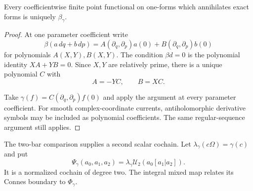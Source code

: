 \begin{lemma}\label{mht:lem:point-current-classification}
Every coefficientwise finite point functional on one-forms
which annihilates exact forms is uniquely $\beta_\gamma$.
\end{lemma}
\begin{proof}
At one parameter coefficient write
\[
 \beta(a\,dq+b\,dp)
   =A(\partial_q,\partial_p)a(0)
       +B(\partial_q,\partial_p)b(0)
\]
for polynomials $A(X,Y),B(X,Y)$.
The condition $\beta d=0$ is the polynomial identity
$XA+YB=0$. Since $X,Y$ are relatively prime, there is a
unique polynomial $C$ with
\[
 A=-YC,\qquad B=XC.
\]

Take $\gamma(f)=C(\partial_q,\partial_p)f(0)$ and apply
the argument at every parameter coefficient.
For smooth complex-coordinate currents, antiholomorphic
derivative symbols may be included as polynomial coefficients.
The same regular-sequence argument still applies.
\end{proof}

The two-bar comparison supplies a second scalar cochain.
Let $\lambda_\gamma(c\Omega)=\gamma(c)$ and put
\[
 \Psi_\gamma(a_0,a_1,a_2)
      =\lambda_\gamma\mathcal U_2(a_0[a_1|a_2]).
\]
It is a normalized cochain of degree two.
The integral mixed map relates its Connes boundary to
$\Phi_\gamma$.

